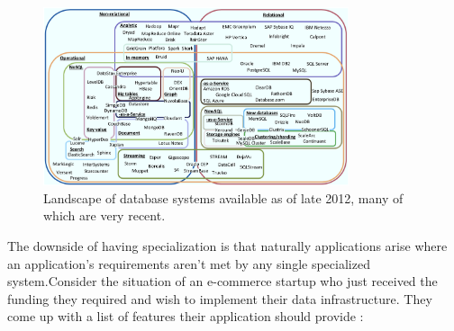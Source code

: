 \begin{figure}
 \centering
  \includegraphics[width=0.8\textwidth]{images/DBLandscapeWithStream.png}
  \caption{Landscape of database systems available as of late 2012, many of which are very recent.}
  \label{fig:dblandscape}
\end{figure}


The downside of having specialization is that naturally applications arise where an application's requirements aren't met by any single specialized system.Consider the situation of an e-commerce startup who just received the funding they required and wish to implement their data infrastructure. They come up with a list of features their application should provide : 

